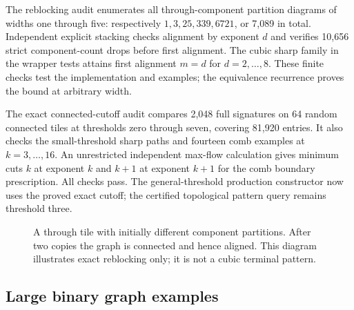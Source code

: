 The reblocking audit enumerates all through-component partition diagrams of
widths one through five: respectively $1,3,25,339,6721$, or 7,089 in total.
Independent explicit stacking checks alignment by exponent $d$ and verifies
10,656 strict component-count drops before first alignment. The cubic sharp
family in the wrapper tests attains first alignment $m=d$ for $d=2,\ldots,8$.
These finite checks test the implementation and examples; the equivalence
recurrence proves the bound at arbitrary width.

The exact connected-cutoff audit compares 2,048 full signatures on 64 random
connected tiles at thresholds zero through seven, covering 81,920 entries.
It also checks the small-threshold sharp paths and fourteen comb examples at
$k=3,\ldots,16$. An unrestricted independent max-flow calculation gives
minimum cuts $k$ at exponent $k$ and $k+1$ at exponent $k+1$ for the comb
boundary prescription. All checks pass. The general-threshold production
constructor now uses the proved exact cutoff; the certified topological
pattern query remains threshold three.

\begin{figure}[tb]
\centering
{}
\caption{A through tile with initially different component partitions.
After two copies the graph is connected and hence aligned. This diagram
illustrates exact reblocking only; it is not a cubic terminal pattern.}
\label{fig:reblocking}
\end{figure}

\subsection{Large binary graph examples}

